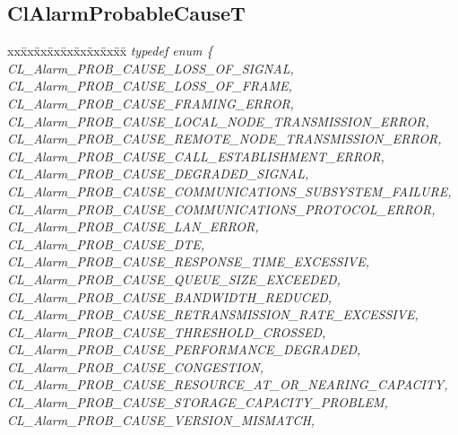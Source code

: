 \begin{flushleft}
\subsection{ClAlarmProbableCauseT}
\begin{tabbing}
xx\=xx\=xx\=xx\=xx\=xx\=xx\=xx\=xx\=\kill
\textit{typedef enum \{}\\
\>\>\>\>\textit{CL\_Alarm\_PROB\_CAUSE\_LOSS\_OF\_SIGNAL,}\\
\>\>\>\>\textit{CL\_Alarm\_PROB\_CAUSE\_LOSS\_OF\_FRAME,}\\
\>\>\>\>\textit{CL\_Alarm\_PROB\_CAUSE\_FRAMING\_ERROR,}\\
\>\>\>\>\textit{CL\_Alarm\_PROB\_CAUSE\_LOCAL\_NODE\_TRANSMISSION\_ERROR,}\\
\>\>\>\>\textit{CL\_Alarm\_PROB\_CAUSE\_REMOTE\_NODE\_TRANSMISSION\_ERROR,}\\
\>\>\>\>\textit{CL\_Alarm\_PROB\_CAUSE\_CALL\_ESTABLISHMENT\_ERROR,}\\
\>\>\>\>\textit{CL\_Alarm\_PROB\_CAUSE\_DEGRADED\_SIGNAL,}\\
\>\>\>\>\textit{CL\_Alarm\_PROB\_CAUSE\_COMMUNICATIONS\_SUBSYSTEM\_FAILURE,}\\
\>\>\>\>\textit{CL\_Alarm\_PROB\_CAUSE\_COMMUNICATIONS\_PROTOCOL\_ERROR,}\\
\>\>\>\>\textit{CL\_Alarm\_PROB\_CAUSE\_LAN\_ERROR,}\\
\>\>\>\>\textit{CL\_Alarm\_PROB\_CAUSE\_DTE,}\\
\>\>\>\>\textit{CL\_Alarm\_PROB\_CAUSE\_RESPONSE\_TIME\_EXCESSIVE,}\\
\>\>\>\>\textit{CL\_Alarm\_PROB\_CAUSE\_QUEUE\_SIZE\_EXCEEDED,}\\
\>\>\>\>\textit{CL\_Alarm\_PROB\_CAUSE\_BANDWIDTH\_REDUCED,}\\
\>\>\>\>\textit{CL\_Alarm\_PROB\_CAUSE\_RETRANSMISSION\_RATE\_EXCESSIVE,}\\
\>\>\>\>\textit{CL\_Alarm\_PROB\_CAUSE\_THRESHOLD\_CROSSED,}\\
\>\>\>\>\textit{CL\_Alarm\_PROB\_CAUSE\_PERFORMANCE\_DEGRADED,}\\
\>\>\>\>\textit{CL\_Alarm\_PROB\_CAUSE\_CONGESTION,}\\
\>\>\>\>\textit{CL\_Alarm\_PROB\_CAUSE\_RESOURCE\_AT\_OR\_NEARING\_CAPACITY,}\\
\>\>\>\>\textit{CL\_Alarm\_PROB\_CAUSE\_STORAGE\_CAPACITY\_PROBLEM,}\\
\>\>\>\>\textit{CL\_Alarm\_PROB\_CAUSE\_VERSION\_MISMATCH,}\\

\end{tabbing}
\end{flushleft}

